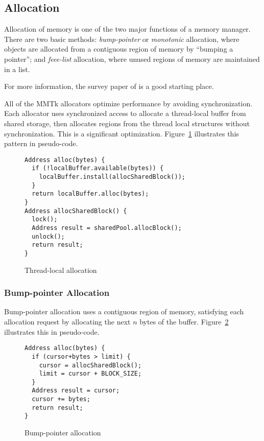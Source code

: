 \subsection{Allocation}

Allocation of memory is one of the two major functions of a memory manager.  There are
two basic methods: \emph{bump-pointer} or \emph{monotonic} allocation, where objects
are allocated from a contiguous region of memory by ``bumping a pointer''; and 
\emph{feee-list} allocation, where unused regions of memory are maintained in
a list.

For more information, the survey paper of \citet{WJNB:95} is a good starting place.

All of the MMTk allocators optimize performance by avoiding synchronization.  
Each allocator uses synchronized access to allocate a thread-local buffer from shared storage,
then allocates regions from the thread local structures without synchronization.  This
is a significant optimization.  Figure~\ref{fig:intro:thread-local-alloc} 
illustrates this pattern in  pseudo-code.

\begin{figure}
\begin{centering}
\begin{lstlisting}
Address alloc(bytes) {
  if (!localBuffer.available(bytes)) {
    localBuffer.install(allocSharedBlock());
  }
  return localBuffer.alloc(bytes);
}
Address allocSharedBlock() {
  lock();
  Address result = sharedPool.allocBlock();
  unlock();
  return result;
}
\end{lstlisting}
\end{centering}
\caption{Thread-local allocation}
\label{fig:intro:thread-local-alloc}
\end{figure}


\subsubsection{Bump-pointer Allocation}

Bump-pointer allocation uses a contiguous region of memory, satisfying each allocation
request by allocating the next $n$ bytes of the buffer.  Figure~\ref{fig:intro:bump-pointer}
illustrates this in pseudo-code.  

\begin{figure}[h!]
\begin{centering}
\begin{lstlisting}
Address alloc(bytes) {
  if (cursor+bytes > limit) {
    cursor = allocSharedBlock();
    limit = cursor + BLOCK_SIZE;
  }
  Address result = cursor;
  cursor += bytes;
  return result;
}
\end{lstlisting}
\end{centering}
\caption{Bump-pointer allocation}
\label{fig:intro:bump-pointer}
\end{figure}

